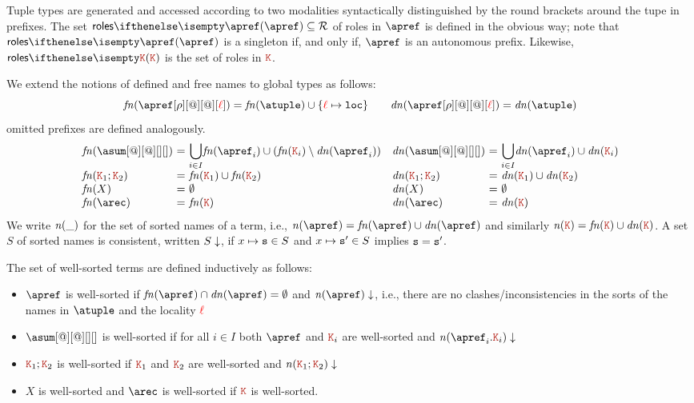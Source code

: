 Tuple types are generated and accessed according to two modalities
syntactically distinguished by the round brackets around the tupe
in prefixes.
%
The set $\roles \apref \subseteq \roleset$ of roles in $\apref$ is
defined in the obvious way; note that $\roles \apref$ is a singleton
if, and only if, $\apref$ is an autonomous prefix.
%
Likewise, $\roles \aK$ is the set of roles in
$\aK$.

We extend the notions of defined and free names to global types as
follows:
\[
 \fn{\apref[\arole][@][@][\alocvar]}
 = \fn \atuple \cup \{\alocvar \mapsto \asort[loc]\} 
\qquad
 \dn{\apref[\arole][@][@][\alocvar]} 
 = \dn \atuple 
\]
omitted prefixes are defined analogously.
\[
  \begin{array}{ll}
    \begin{array}{l@{\ =\ } ll}
      \fn{\asum[@][@][][]} & \displaystyle{\bigcup_{i\in I}} \fn{\apref_i} \cup (\fn{\aK_i}\setminus\dn{\apref_i})
      \\
      \fn{\aK_1; \aK_2} 
                &
                  \fn{\aK_1}\cup\fn{\aK_2}
      \\
      \fn X & \emptyset
      \\
      \fn \arec & \fn {\aK}
    \end{array}
    \begin{array}{l@{\ =\ } ll}
      \dn{\asum[@][@][][]} & \displaystyle{\bigcup_{i\in I}} \dn{\apref_i} \cup \dn{\aK_i}
      \\
      \dn{\aK_1; \aK_2} 
                           &
                             \dn{\aK_1}\cup\dn{\aK_2}
      \\
      \dn X & \emptyset
      \\
      \dn \arec & \dn {\aK}
    \end{array}
  \end{array}
\]
%
We write ${\it n}(\_)$ for the set of sorted names of a term, i.e.,
$\names \apref = \fn\apref \cup \dn\apref$ and similarly
$\names \aK = \fn\aK \cup \dn\aK$. A set $S$ of sorted names is
consistent, written $S\downarrow$, if $x\mapsto \mathtt{s} \in S$ and
$x\mapsto \mathtt{s}' \in S$ implies $\mathtt{s} = \mathtt{s}'$.
 
The set of well-sorted terms are defined inductively as follows:

\begin{itemize}
\item $\apref$ is well-sorted if $\fn\apref\cap\dn\apref = \emptyset$ and  
$\consistent{\names\apref}$, i.e., there are no clashes/inconsistencies in the sorts of 
the names in $\atuple$ and the locality ${\color{red}\ell}$
\item $\asum[@][@][][]$ is well-sorted if for all ${i\in I}$ both
  $\apref$ and ${\aK_i}$ are well-sorted and
  $\consistent{\names {\apref_i.\aK_i}}$
\item $\aK_1;\aK_2$ is well-sorted if $\aK_1$ and $\aK_2$ are
  well-sorted and $\consistent{\names{\aK_1;\aK_2}}$
\item $X$ is well-sorted and $\arec$ is well-sorted if $\aK$ is
  well-sorted.
\end{itemize}



